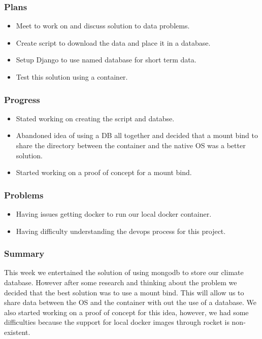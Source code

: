 \documentclass[onecolumn, draftclsnofoot,10pt, compsoc]{article}
\begin{document}
			\subsubsection{Plans}
			    \begin{itemize}
			        \item Meet to work on and discuss solution to data problems.\\
			        \item Create script to download the data and place it in a database.\\
			        \item Setup Django to use named database for short term data.\\
			        \item Test this solution using a container.\\
			    \end{itemize}
			\subsubsection{Progress}
			    \begin{itemize}
			        \item Stated working on creating the script and databse.\\
			        \item Abandoned idea of using a DB all together and decided that a mount bind to share the directory between the container and the native OS was a better solution.\\
			        \item Started working on a proof of concept for a mount bind.
			    \end{itemize}
			
			\subsubsection{Problems}
			    \begin{itemize}
			        \item Having issues getting docker to run our local docker container.\\
			        \item Having difficulty understanding the devops process for this project.\\
			    \end{itemize}
			
			\subsubsection{Summary} This week we entertained the solution of using mongodb to store our climate database. However after some research and thinking about the problem we decided that the best solution was to use a mount bind. This will allow us to share data between the OS and the container with out the use of a database. We also started working on a proof of concept for this idea, however, we had some difficulties because the support for local docker images through rocket is non-existent.\\
			
\end{document}
